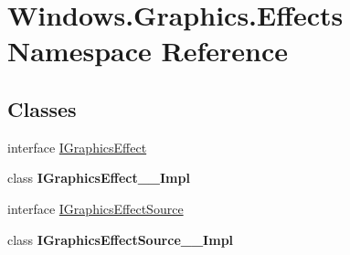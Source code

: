\hypertarget{namespace_windows_1_1_graphics_1_1_effects}{}\section{Windows.\+Graphics.\+Effects Namespace Reference}
\label{namespace_windows_1_1_graphics_1_1_effects}
\subsection*{Classes}
\begin{DoxyCompactItemize}
\item 
interface \hyperlink{interface_windows_1_1_graphics_1_1_effects_1_1_i_graphics_effect}{I\+Graphics\+Effect}
\item 
class {\bfseries I\+Graphics\+Effect\+\_\+\+\_\+\+Impl}
\item 
interface \hyperlink{interface_windows_1_1_graphics_1_1_effects_1_1_i_graphics_effect_source}{I\+Graphics\+Effect\+Source}
\item 
class {\bfseries I\+Graphics\+Effect\+Source\+\_\+\+\_\+\+Impl}
\end{DoxyCompactItemize}
